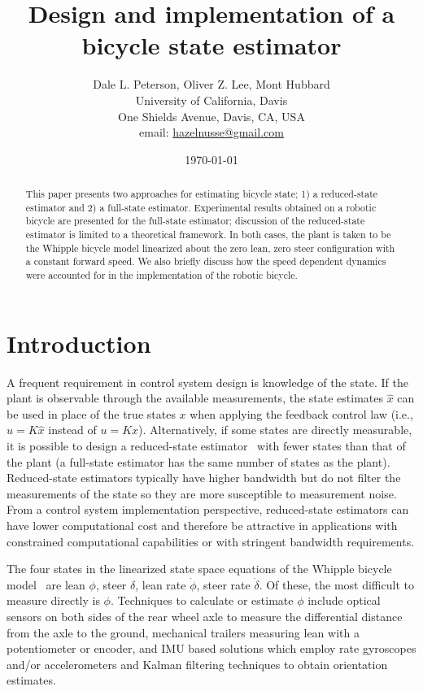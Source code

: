 \documentclass[letterpaper,11pt]{article}
\begin{document}
\title{Design and implementation of a bicycle state estimator}
\author{Dale L. Peterson, Oliver Z. Lee, Mont Hubbard\\University of
California, Davis\\One Shields Avenue, Davis, CA,
USA\\email: \href{mailto:hazelnusse@gmail.com}{hazelnusse@gmail.com}}
\date{\today}
\maketitle

\begin{abstract}
This paper presents two approaches for estimating bicycle state; 1) a
reduced-state estimator and 2) a full-state estimator. Experimental results
obtained on a robotic bicycle are presented for the full-state estimator;
discussion of the reduced-state estimator is limited to a theoretical
framework. In both cases, the plant is taken to be the Whipple bicycle model
linearized about the zero lean, zero steer configuration with a constant
forward speed.  We also briefly discuss how the speed dependent dynamics were
accounted for in the implementation of the robotic bicycle.
\end{abstract}

\section{Introduction} \label{sec:introduction}
A frequent requirement in control system design is knowledge of the state.  If
the plant is observable through the available measurements, the state estimates
$\hat{x}$ can be used in place of the true states $x$ when applying the
feedback control law (i.e., $u=K\hat{x}$ instead of $u=Kx$). Alternatively, if
some states are directly measurable, it is possible to design a reduced-state
estimator~\cite{Bryson1970} with fewer states than that of the plant (a
full-state estimator has the same number of states as the plant).
Reduced-state estimators typically have higher bandwidth but do not filter the
measurements of the state so they are more susceptible to measurement noise.
From a control system implementation perspective, reduced-state estimators can
have lower computational cost and therefore be attractive in applications with
constrained computational capabilities or with stringent bandwidth
requirements.

The four states in the linearized state space equations of the Whipple bicycle
model~\cite{Meijaard2007} are lean $\phi$, steer $\delta$, lean rate $\dot{\phi}$, steer rate
$\dot{\delta}$.  Of these, the most difficult to measure directly is $\phi$.
Techniques to calculate or estimate $\phi$ include optical sensors on both sides
of the rear wheel axle to measure the differential distance from the axle to the ground,
mechanical trailers measuring lean with a potentiometer or encoder, and IMU
based solutions which employ rate gyroscopes and/or accelerometers and Kalman
filtering techniques to obtain orientation estimates\cite{Boniolo2008}.
\end{document}
